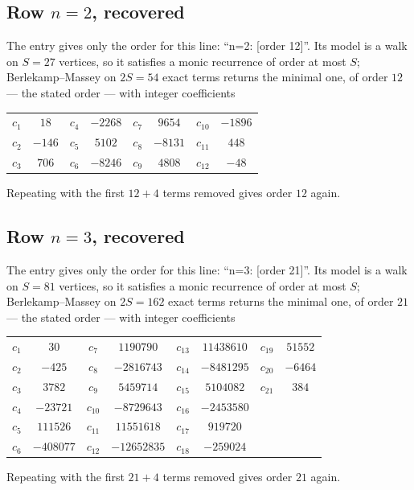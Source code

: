 \documentclass[11pt,a4paper]{article}
\theoremstyle{plain}
\theoremstyle{definition}
\begin{document}
\subsection*{Row $n=2$, recovered}
The entry gives only the order for this line: ``n=2: [order 12]''. Its model is a walk on
$S=27$ vertices, so it satisfies a monic recurrence of order at most $S$;
Berlekamp--Massey on $2S=54$ exact terms returns the minimal one, of order
$12$ --- the stated order --- with integer coefficients
\begin{center}\small\begin{tabular}{cccccccc}
$c_{1}$ & $18$ & $c_{4}$ & $-2268$ & $c_{7}$ & $9654$ & $c_{10}$ & $-1896$ \\
$c_{2}$ & $-146$ & $c_{5}$ & $5102$ & $c_{8}$ & $-8131$ & $c_{11}$ & $448$ \\
$c_{3}$ & $706$ & $c_{6}$ & $-8246$ & $c_{9}$ & $4808$ & $c_{12}$ & $-48$ \\
\end{tabular}\end{center}
Repeating with the first $12+4$ terms removed gives order $12$ again.

\subsection*{Row $n=3$, recovered}
The entry gives only the order for this line: ``n=3: [order 21]''. Its model is a walk on
$S=81$ vertices, so it satisfies a monic recurrence of order at most $S$;
Berlekamp--Massey on $2S=162$ exact terms returns the minimal one, of order
$21$ --- the stated order --- with integer coefficients
\begin{center}\small\begin{tabular}{cccccccc}
$c_{1}$ & $30$ & $c_{7}$ & $1190790$ & $c_{13}$ & $11438610$ & $c_{19}$ & $51552$ \\
$c_{2}$ & $-425$ & $c_{8}$ & $-2816743$ & $c_{14}$ & $-8481295$ & $c_{20}$ & $-6464$ \\
$c_{3}$ & $3782$ & $c_{9}$ & $5459714$ & $c_{15}$ & $5104082$ & $c_{21}$ & $384$ \\
$c_{4}$ & $-23721$ & $c_{10}$ & $-8729643$ & $c_{16}$ & $-2453580$ &  &  \\
$c_{5}$ & $111526$ & $c_{11}$ & $11551618$ & $c_{17}$ & $919720$ &  &  \\
$c_{6}$ & $-408077$ & $c_{12}$ & $-12652835$ & $c_{18}$ & $-259024$ &  &  \\
\end{tabular}\end{center}
Repeating with the first $21+4$ terms removed gives order $21$ again.
\end{document}
